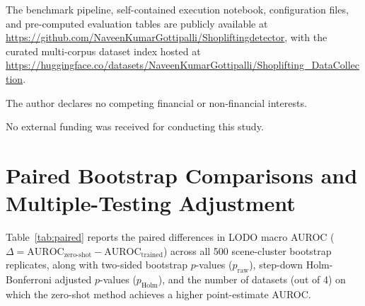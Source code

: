 \documentclass[pdflatex,sn-mathphys-num]{sn-jnl}
\begin{document}
\backmatter

The benchmark pipeline, self-contained execution notebook, configuration files, and pre-computed evaluation tables are publicly available at \url{https://github.com/NaveenKumarGottipalli/Shopliftingdetector}, with the curated multi-corpus dataset index hosted at \url{https://huggingface.co/datasets/NaveenKumarGottipalli/Shoplifting_DataCollection}.

The author declares no competing financial or non-financial interests.

No external funding was received for conducting this study.

\appendix

\section{Paired Bootstrap Comparisons and Multiple-Testing Adjustment}\label{app:paired}

Table~\ref{tab:paired} reports the paired differences in LODO macro AUROC ($\Delta = \text{AUROC}_{\text{zero-shot}} - \text{AUROC}_{\text{trained}}$) across all 500 scene-cluster bootstrap replicates, along with two-sided bootstrap $p$-values ($p_{\text{raw}}$), step-down Holm-Bonferroni adjusted $p$-values ($p_{\text{Holm}}$), and the number of datasets (out of 4) on which the zero-shot method achieves a higher point-estimate AUROC.

\TablePaired


\end{document}
